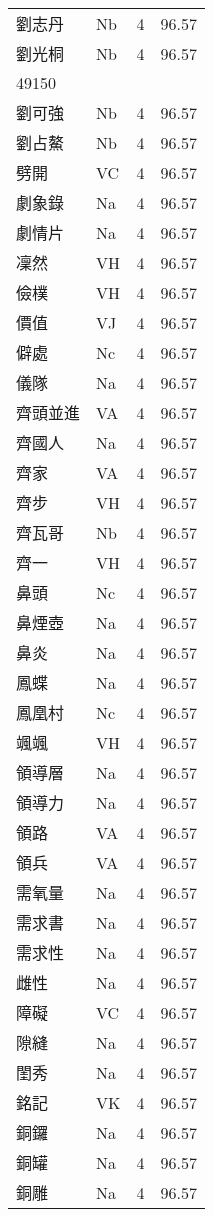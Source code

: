 \documentclass[twocolumn]{book}
\begin{document}
\begin{supertabular}{llrr}
劉志丹 & Nb & 4 &  96.57\\
劉光桐 & Nb & 4 &  96.57\\
49150\\
劉可強 & Nb & 4 &  96.57\\
劉占鰲 & Nb & 4 &  96.57\\
劈開 & VC & 4 &  96.57\\
劇象錄 & Na & 4 &  96.57\\
劇情片 & Na & 4 &  96.57\\
凜然 & VH & 4 &  96.57\\
儉樸 & VH & 4 &  96.57\\
價值 & VJ & 4 &  96.57\\
僻處 & Nc & 4 &  96.57\\
儀隊 & Na & 4 &  96.57\\
齊頭並進 & VA & 4 &  96.57\\
齊國人 & Na & 4 &  96.57\\
齊家 & VA & 4 &  96.57\\
齊步 & VH & 4 &  96.57\\
齊瓦哥 & Nb & 4 &  96.57\\
齊一 & VH & 4 &  96.57\\
鼻頭 & Nc & 4 &  96.57\\
鼻煙壺 & Na & 4 &  96.57\\
鼻炎 & Na & 4 &  96.57\\
鳳蝶 & Na & 4 &  96.57\\
鳳凰村 & Nc & 4 &  96.57\\
颯颯 & VH & 4 &  96.57\\
領導層 & Na & 4 &  96.57\\
領導力 & Na & 4 &  96.57\\
領路 & VA & 4 &  96.57\\
領兵 & VA & 4 &  96.57\\
需氧量 & Na & 4 &  96.57\\
需求書 & Na & 4 &  96.57\\
需求性 & Na & 4 &  96.57\\
雌性 & Na & 4 &  96.57\\
障礙 & VC & 4 &  96.57\\
隙縫 & Na & 4 &  96.57\\
閨秀 & Na & 4 &  96.57\\
銘記 & VK & 4 &  96.57\\
銅鑼 & Na & 4 &  96.57\\
銅罐 & Na & 4 &  96.57\\
銅雕 & Na & 4 &  96.57\\

\end{supertabular}
\end{document}
